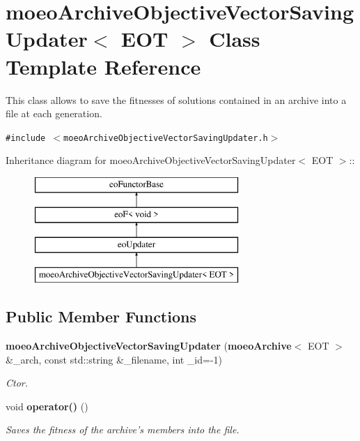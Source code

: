 \section{moeo\-Archive\-Objective\-Vector\-Saving\-Updater$<$ EOT $>$ Class Template Reference}
\label{classmoeoArchiveObjectiveVectorSavingUpdater}
This class allows to save the fitnesses of solutions contained in an archive into a file at each generation.  


{\tt \#include $<$moeo\-Archive\-Objective\-Vector\-Saving\-Updater.h$>$}

Inheritance diagram for moeo\-Archive\-Objective\-Vector\-Saving\-Updater$<$ EOT $>$::\begin{figure}[H]
\begin{center}
\leavevmode
\includegraphics[height=4cm]{classmoeoArchiveObjectiveVectorSavingUpdater}
\end{center}
\end{figure}
\subsection*{Public Member Functions}
\begin{CompactItemize}
\item 
{\bf moeo\-Archive\-Objective\-Vector\-Saving\-Updater} ({\bf moeo\-Archive}$<$ EOT $>$ \&\_\-arch, const std::string \&\_\-filename, int \_\-id=-1)
\begin{CompactList}\small\item\em Ctor. \item\end{CompactList}\item 
void {\bf operator()} ()\label{classmoeoArchiveObjectiveVectorSavingUpdater_1f7247a7d29cb0e9cd314ff46f1cc332}

\begin{CompactList}\small\item\em Saves the fitness of the archive's members into the file. \item\end{CompactList}\end{CompactItemize}
